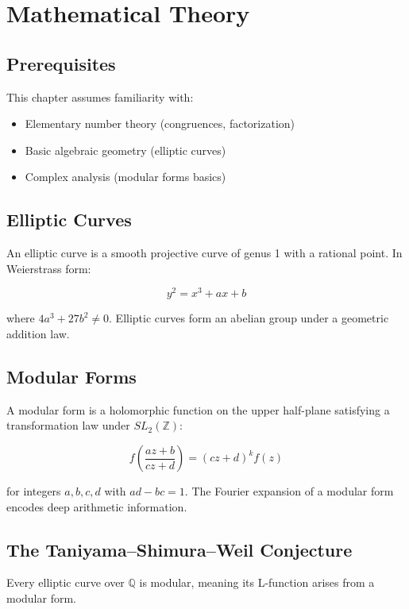 \section{Mathematical Theory}


\subsection{Prerequisites}
This chapter assumes familiarity with:
\begin{itemize}
\item Elementary number theory (congruences, factorization)
\item Basic algebraic geometry (elliptic curves)
\item Complex analysis (modular forms basics)
\end{itemize}

\subsection{Elliptic Curves}

An elliptic curve is a smooth projective curve of genus 1 with a rational point. In Weierstrass form:

\begin{equation}
y^2 = x^3 + ax + b
\end{equation}

where $4a^3 + 27b^2 \neq 0$. Elliptic curves form an abelian group under a geometric addition law.

\subsection{Modular Forms}

A modular form is a holomorphic function on the upper half-plane satisfying a transformation law under $SL_2(\mathbb{Z})$:

\begin{equation}
f\left(\frac{az+b}{cz+d}\right) = (cz+d)^k f(z)
\end{equation}

for integers $a,b,c,d$ with $ad-bc = 1$. The Fourier expansion of a modular form encodes deep arithmetic information.

\subsection{The Taniyama--Shimura--Weil Conjecture}

\begin{conjecture}
Every elliptic curve over $\mathbb{Q}$ is modular, meaning its L-function arises from a modular form.
\end{conjecture}

